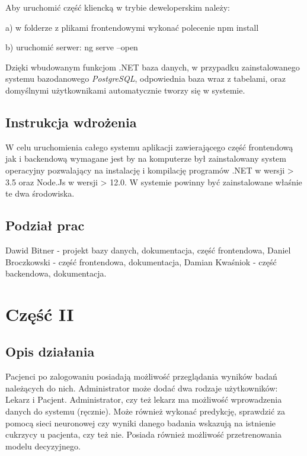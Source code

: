 \documentclass[12pt,a4paper]{article}
\begin{document}
    Aby uruchomić część kliencką w trybie deweloperskim należy:
    
    a) w folderze z plikami frontendowymi wykonać polecenie npm install
    
    b) uruchomić serwer: ng serve --open
    
    Dzięki wbudowanym funkcjom .NET baza danych, w przypadku zainstalowanego systemu bazodanowego \textit{PostgreSQL}, odpowiednia baza wraz z tabelami, oraz domyślnymi użytkownikami automatycznie tworzy się w systemie.


	\subsection{Instrukcja wdrożenia}
W celu uruchomienia całego systemu aplikacji zawierającego część frontendową jak i backendową wymagane jest by na komputerze był zainstalowany system operacyjny pozwalający na instalację i kompilację programów .NET w wersji > 3.5 oraz Node.Js w wersji > 12.0.
W systemie powinny być zainstalowane właśnie te dwa środowiska.

	\subsection*{Podział prac}

Dawid Bitner - projekt bazy danych, dokumentacja, część frontendowa,\newline
Daniel Broczkowski - część frontendowa, dokumentacja,\newline
Damian Kwaśniok -  część backendowa, dokumentacja.

	\newpage
	\section*{Część II}
	\subsection*{Opis działania} 
Pacjenci po zalogowaniu posiadają możliwość przeglądania wyników badań należących do nich. Administrator może dodać dwa rodzaje użytkowników: Lekarz i Pacjent. Administrator, czy też lekarz ma możliwość wprowadzenia danych do systemu (ręcznie). Może również wykonać predykcję, sprawdzić za pomocą sieci neuronowej czy wyniki danego badania wskazują na istnienie cukrzycy u pacjenta, czy też nie. Posiada również możliwość przetrenowania modelu decyzyjnego.
\end{document}
